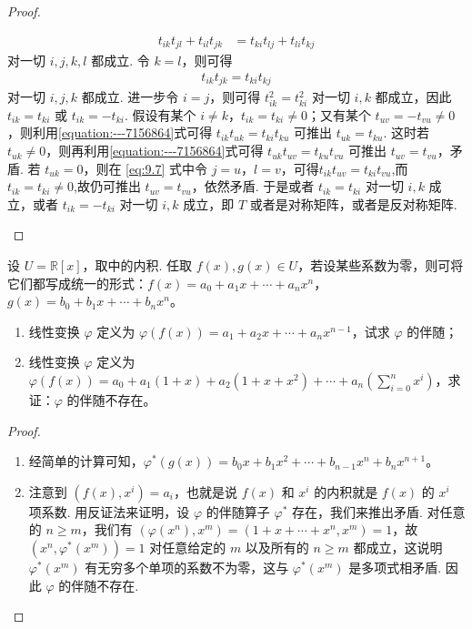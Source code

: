 \documentclass[../../main.tex]{subfiles}%
\begin{document}
\begin{proof}
\begin{enumerate}[(1)]
\begin{align}
t_{ik}t_{jl}+t_{il}t_{jk}&=t_{ki}t_{lj}+t_{li}t_{kj}\label{eq:9.7}
\end{align}
对一切 \(i,j,k,l\) 都成立. 令 \(k = l\)，则可得
\begin{align}\label{equation:---7156864}
t_{ik}t_{jk}=t_{ki}t_{kj}
\end{align}
对一切 \(i,j,k\) 都成立. 进一步令 \(i = j\)，则可得 \(t_{ik}^2 = t_{ki}^2\) 对一切 \(i,k\) 都成立，因此 \(t_{ik}=t_{ki}\) 或 \(t_{ik}=-t_{ki}\). 假设有某个 \(i\neq k\)，\(t_{ik}=t_{ki}\neq0\)；又有某个 \(t_{uv}=-t_{vu}\neq0\)，则利用\eqref{equation:---7156864}式可得 \(t_{ik}t_{uk}=t_{ki}t_{ku}\) 可推出 \(t_{uk}=t_{ku}\). 这时若 \(t_{uk}\neq0\)，则再利用\eqref{equation:---7156864}式可得 \(t_{uk}t_{uv}=t_{ku}t_{vu}\) 可推出 \(t_{uv}=t_{vu}\)，矛盾. 若 \(t_{uk}=0\)，则在 \eqref{eq:9.7} 式中令 \(j = u\)，\(l = v\)，可得$t_{ik}t_{uv}=t_{ki}t_{vu}$,而\(t_{ik}=t_{ki}\neq0\),故仍可推出 \(t_{uv}=t_{vu}\)，依然矛盾. 于是或者 \(t_{ik}=t_{ki}\) 对一切 \(i,k\) 成立，或者 \(t_{ik}=-t_{ki}\) 对一切 \(i,k\) 成立，即 \(T\) 或者是对称矩阵，或者是反对称矩阵.
\end{enumerate} 

\end{proof}

\begin{proposition}\label{proposition:例9.31}
设 \(U = \mathbb{R}[x]\)，取中的内积. 任取 \(f(x),g(x)\in U\)，若设某些系数为零，则可将它们都写成统一的形式：\(f(x)=a_0 + a_1x+\cdots + a_nx^n\)，\(g(x)=b_0 + b_1x+\cdots + b_nx^n\)。
\begin{enumerate}[(1)]
\item 线性变换 \(\varphi\) 定义为 \(\varphi(f(x))=a_1 + a_2x+\cdots + a_nx^{n - 1}\)，试求 \(\varphi\) 的伴随；
\item 线性变换 \(\varphi\) 定义为 \(\varphi(f(x))=a_0 + a_1(1 + x)+a_2(1 + x + x^2)+\cdots + a_n(\sum_{i = 0}^{n}x^i)\)，求证：\(\varphi\) 的伴随不存在。
\end{enumerate}
\end{proposition}
\begin{proof}
\begin{enumerate}[(1)]
\item 经简单的计算可知，\(\varphi^*(g(x))=b_0x + b_1x^2+\cdots + b_{n - 1}x^n + b_nx^{n + 1}\)。
\item 注意到 \((f(x),x^i)=a_i\)，也就是说 \(f(x)\) 和 \(x^i\) 的内积就是 \(f(x)\) 的 \(x^i\) 项系数. 用反证法来证明，设 \(\varphi\) 的伴随算子 \(\varphi^*\) 存在，我们来推出矛盾. 对任意的 \(n\geqslant  m\)，我们有 \((\varphi(x^n),x^m)=(1 + x+\cdots + x^n,x^m)=1\)，故 \((x^n,\varphi^*(x^m)) = 1\) 对任意给定的 \(m\) 以及所有的 \(n\geqslant  m\) 都成立，这说明 \(\varphi^*(x^m)\) 有无穷多个单项的系数不为零，这与 \(\varphi^*(x^m)\) 是多项式相矛盾. 因此 \(\varphi\) 的伴随不存在.
\end{enumerate} 

\end{proof}
\end{document}
